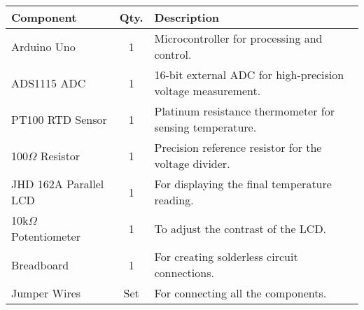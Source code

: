 \begin{tabular}{|l|c|p{4cm}|}
    \hline
    \textbf{Component} & \textbf{Qty.} & \textbf{Description} \\
    \hline
    Arduino Uno & 1 & Microcontroller for processing and control. \\
    \hline
    ADS1115 ADC & 1 & 16-bit external ADC for high-precision voltage measurement. \\
    \hline
    PT100 RTD Sensor & 1 & Platinum resistance thermometer for sensing temperature. \\
    \hline
    100$\Omega$ Resistor & 1 & Precision reference resistor for the voltage divider. \\
    \hline
    JHD 162A Parallel LCD & 1 & For displaying the final temperature reading. \\
    \hline
    10k$\Omega$ Potentiometer & 1 & To adjust the contrast of the LCD. \\
    \hline
    Breadboard & 1 & For creating solderless circuit connections. \\
    \hline
    Jumper Wires & Set & For connecting all the components. \\
    \hline
\end{tabular}
